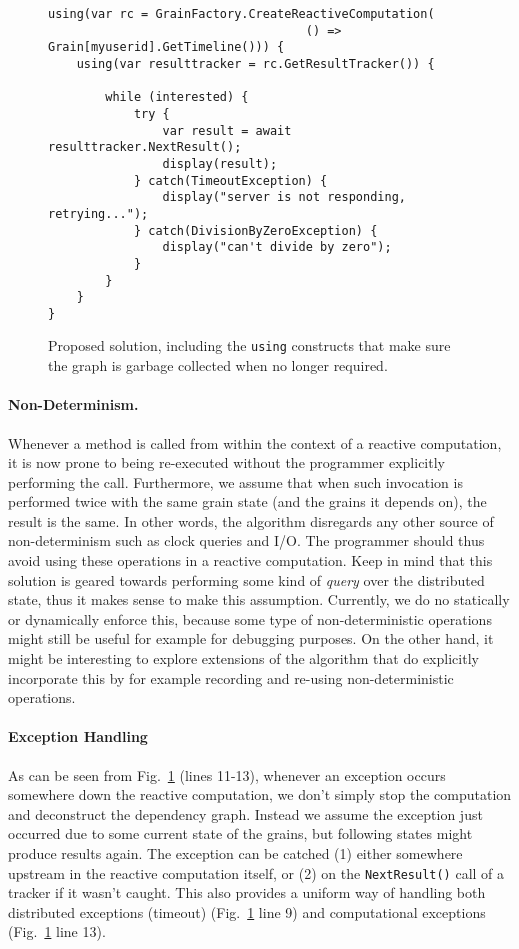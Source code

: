 \begin{figure}
\begin{lstlisting}
using(var rc = GrainFactory.CreateReactiveComputation(
									() => Grain[myuserid].GetTimeline())) {
	using(var resulttracker = rc.GetResultTracker()) {

		while (interested) {
			try {
				var result = await resulttracker.NextResult();
				display(result);
			} catch(TimeoutException) { 
				display("server is not responding, retrying...");
			} catch(DivisionByZeroException) {
				display("can't divide by zero");			
			}
		}
	}
}
\end{lstlisting}
\caption{Proposed solution, including the \texttt{using} constructs that make sure the graph is garbage collected when no longer required.}\label{fig:impl}
\end{figure}

\paragraph{Non-Determinism.}
Whenever a method is called from within the context of a reactive computation, it is now prone to being re-executed without the programmer explicitly performing the call. Furthermore, we assume that when such invocation is performed twice with the same grain state (and the grains it depends on), the result is the same. In other words, the algorithm disregards any other source of non-determinism such as clock queries and I/O. The programmer should thus avoid using these operations in a reactive computation. Keep in mind that this solution is geared towards performing some kind of \emph{query} over the distributed state, thus it makes sense to make this assumption. Currently, we do no statically or dynamically enforce this, because some type of non-deterministic operations might still be useful for example for debugging purposes. On the other hand, it might be interesting to explore extensions of the algorithm that do explicitly incorporate this by for example recording and re-using non-deterministic operations.

\paragraph{Exception Handling}
As can be seen from Fig.~\ref{fig:impl} (lines 11-13), whenever an exception occurs somewhere down the reactive computation, we don't simply stop the computation and deconstruct the dependency graph. Instead we assume the exception just occurred due to some current state of the grains, but following states might produce results again. The exception can be catched (1) either somewhere upstream in the reactive computation itself, or (2) on the \texttt{NextResult()} call of a tracker if it wasn't caught. This also provides a uniform way of handling both distributed exceptions (timeout) (Fig.~\ref{fig:impl} line 9) and computational exceptions (Fig.~\ref{fig:impl} line 13).


